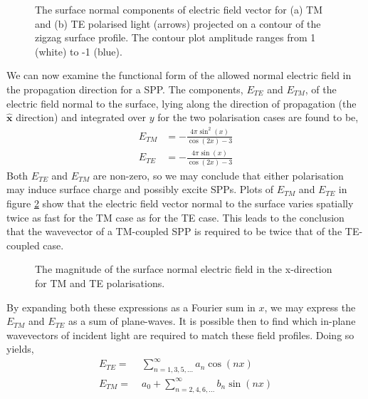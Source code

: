 \begin{figure}
\begin{center}
\end{center}
\caption[The surface normal components of electric field vector for TM and TE polarised light projected on a contour of the zigzag surface profile.]{The surface normal components of electric field vector for (a) TM and (b) TE polarised light (arrows) projected on a contour of the zigzag surface profile. The contour plot amplitude ranges from 1 (white) to -1 (blue). \label{fig:zzEnormal}}
\end{figure}

We can now examine the functional form of the allowed normal electric field in the propagation direction for a SPP. The components, $E_{TE}$ and $E_{TM}$, of the electric field normal to the surface, lying along the direction of propagation (the $\mathbf{\hat{x}}$ direction) and integrated over $y$ for the two polarisation cases are found to be,
\begin{align}
E_{TM}& = -\frac{4\pi \sin^2{(x)}}{\cos{(2x)-3}}\label{eq:etm}\\
E_{TE} &= -\frac{4\pi \sin{(x)}}{\cos{(2x)-3}}\label{eq:ete}
\end{align}
Both $E_{TE}$ and $E_{TM}$ are non-zero, so we may conclude that either polarisation may induce surface charge and possibly excite SPPs. Plots of $E_{TM}$ and $E_{TE}$ in figure \ref{fig:e-te-and-e-tm} show that the electric field vector normal to the surface varies spatially twice as fast for the TM case as for the TE case. This leads to the conclusion that the wavevector of a TM-coupled SPP is required to be twice that of the TE-coupled case.
\begin{figure}
\begin{center}

\caption{The magnitude of the surface normal electric field in the x-direction for TM and TE polarisations.\label{fig:e-te-and-e-tm}}
\end{center}
\end{figure}
By expanding both these expressions as a Fourier sum in $x$, we may express the $E_{TM}$ and $E_{TE}$ as a sum of plane-waves. It is possible then to find which in-plane wavevectors of incident light are required to match these field profiles. Doing so yields,
\begin{align}
E_{TE}=&\;\!\!\!\!\!\sum\limits_{n=1,3,5,...}^\infty \!\!\!\!\!a_n\cos{(nx)}\label{eq:zz-tmcouping}\\
E_{TM}=&\;a_0+\!\!\!\!\!\displaystyle\sum\limits_{n=2,4,6,...}^\infty \!\!\!\!\!b_n\sin{(nx)}\label{eq:zz-tecoupling}
\end{align}

